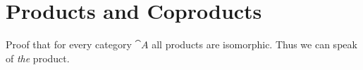 \def\pathToRoot{../../}



\author{Maximilian Wuttke}


\section{Products and Coproducts}

\begin{exercise}
  Proof that for every category $\cat{A}$ all products are isomorphic. Thus we can speak of \emph{the} product.
\end{exercise}


